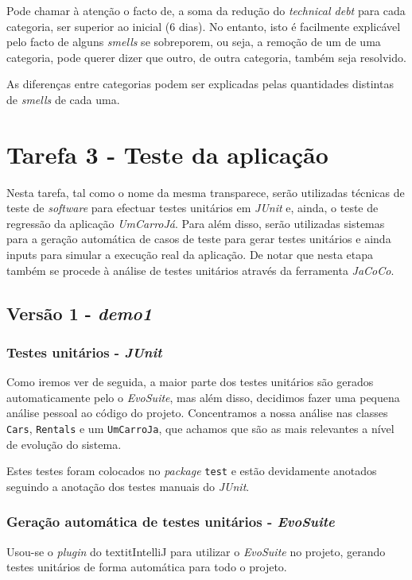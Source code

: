 \documentclass[a4paper]{report}
\begin{document}
Pode chamar à atenção o facto de, a soma da redução do \textit{technical debt} para cada categoria, ser superior ao inicial (6 dias).
No entanto, isto é facilmente explicável pelo facto de alguns \textit{smells} se sobreporem, ou seja, a remoção de um de uma categoria, pode querer dizer que outro, de outra categoria, também seja resolvido.

As diferenças entre categorias podem ser explicadas pelas quantidades distintas de \textit{smells} de cada uma.
    
    

\section{Tarefa 3 - Teste da aplicação}
Nesta tarefa, tal como o nome da mesma transparece, serão utilizadas técnicas de teste de \textit{software} para efectuar testes unitários em \textit{JUnit} e, ainda, o
teste de regressão da aplicação \textit{UmCarroJá}. Para além disso, serão utilizadas sistemas para a geração automática de casos de teste para gerar testes unitários e ainda inputs para simular a execução real da aplicação. De notar que nesta etapa também se procede à análise de testes unitários através da ferramenta \textit{JaCoCo}.

\subsection{Versão 1 - \textit{demo1}}

\subsubsection{Testes unitários - \textit{JUnit}}

Como iremos ver de seguida, a maior parte dos testes unitários são gerados automaticamente pelo o \textit{EvoSuite}, mas além disso, decidimos fazer uma pequena análise pessoal ao código do projeto.
Concentramos a nossa análise nas classes \texttt{Cars}, \texttt{Rentals} e um \texttt{UmCarroJa}, que achamos que são as mais relevantes a nível de evolução do sistema.

Estes testes foram colocados no \textit{package} \texttt{test} e estão devidamente anotados seguindo a anotação dos testes manuais do \textit{JUnit}.

\subsubsection{Geração automática de testes unitários - \textit{EvoSuite}}
Usou-se o \textit{plugin} do textit{IntelliJ} para utilizar o \textit{EvoSuite} no projeto, gerando testes unitários de forma automática para todo o projeto.
\end{document}
